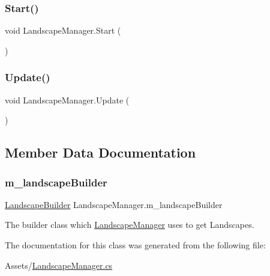 \subsubsection{\texorpdfstring{Start()}{Start()}}
{\footnotesize\ttfamily void Landscape\+Manager.\+Start (\begin{DoxyParamCaption}{ }\end{DoxyParamCaption})\hspace{0.3cm}{\ttfamily [private]}}

\mbox{\label{class_landscape_manager_afa615d6914c117affbe6b97e0b552502}} 
\subsubsection{\texorpdfstring{Update()}{Update()}}
{\footnotesize\ttfamily void Landscape\+Manager.\+Update (\begin{DoxyParamCaption}{ }\end{DoxyParamCaption})\hspace{0.3cm}{\ttfamily [private]}}



\subsection{Member Data Documentation}
\mbox{\label{class_landscape_manager_aa8cb7cbe6921ddb36a5aa73864556a56}} 
\subsubsection{\texorpdfstring{m\+\_\+landscape\+Builder}{m\_landscapeBuilder}}
{\footnotesize\ttfamily \hyperlink{class_landscape_builder}{Landscape\+Builder} Landscape\+Manager.\+m\+\_\+landscape\+Builder\hspace{0.3cm}{\ttfamily [private]}}



The builder class which \hyperlink{class_landscape_manager}{Landscape\+Manager} uses to get Landscapes. 



The documentation for this class was generated from the following file\+:\begin{DoxyCompactItemize}
\item 
Assets/\hyperlink{_landscape_manager_8cs}{Landscape\+Manager.\+cs}\end{DoxyCompactItemize}
